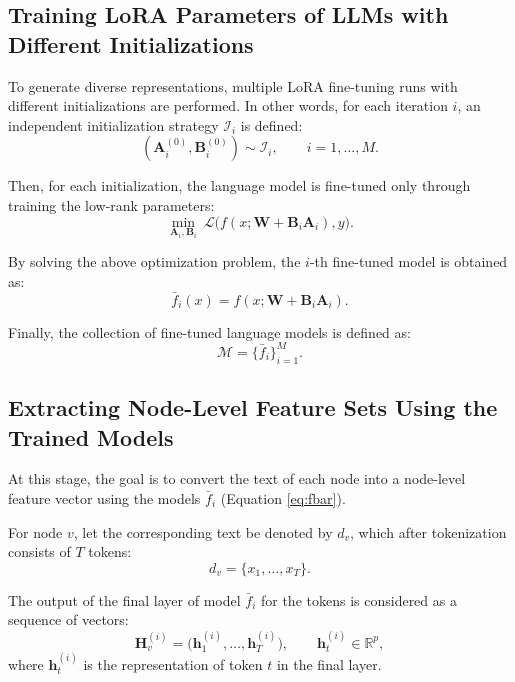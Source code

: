 \documentclass{article}
\begin{document}
\subsection{Training LoRA Parameters of LLMs with Different Initializations}

To generate diverse representations, multiple LoRA fine-tuning runs with different initializations are performed. In other words, for each iteration $i$, an independent initialization strategy $\mathcal{I}_i$ is defined:
\begin{equation}
(\mathbf{A}^{(0)}_i,\mathbf{B}^{(0)}_i)\sim \mathcal{I}_i,\qquad i=1,\dots,M.
\end{equation}

Then, for each initialization, the language model is fine-tuned only through training the low-rank parameters:
\begin{equation}
\min_{\mathbf{A}_i,\mathbf{B}_i}\ \mathcal{L}\big(f(x;\mathbf{W}+\mathbf{B}_i\mathbf{A}_i),y\big).
\end{equation}

By solving the above optimization problem, the $i$-th fine-tuned model is obtained as:
\begin{equation}
\bar{f}_i(x)=f(x;\mathbf{W}+\mathbf{B}_i\mathbf{A}_i).
\label{eq:fbar}
\end{equation}

Finally, the collection of fine-tuned language models is defined as:
\begin{equation}
\mathcal{M}=\{\bar{f}_i\}_{i=1}^{M}.
\end{equation}

\subsection{Extracting Node-Level Feature Sets Using the Trained Models}

At this stage, the goal is to convert the text of each node into a node-level feature vector using the models
$\bar{f}_i$
(Equation \ref{eq:fbar}).

For node $v$, let the corresponding text be denoted by $d_v$, which after tokenization consists of $T$ tokens:
\begin{equation}
d_v=\{x_1,\dots,x_T\}.
\end{equation}

The output of the final layer of model $\bar{f}_i$ for the tokens is considered as a sequence of vectors:
\begin{equation}
\mathbf{H}^{(i)}_v=\big(\mathbf{h}^{(i)}_{1},\dots,\mathbf{h}^{(i)}_{T}\big), \qquad \mathbf{h}^{(i)}_{t}\in\mathbb{R}^{p},
\end{equation}
where $\mathbf{h}^{(i)}_{t}$ is the representation of token $t$ in the final layer.
\end{document}
